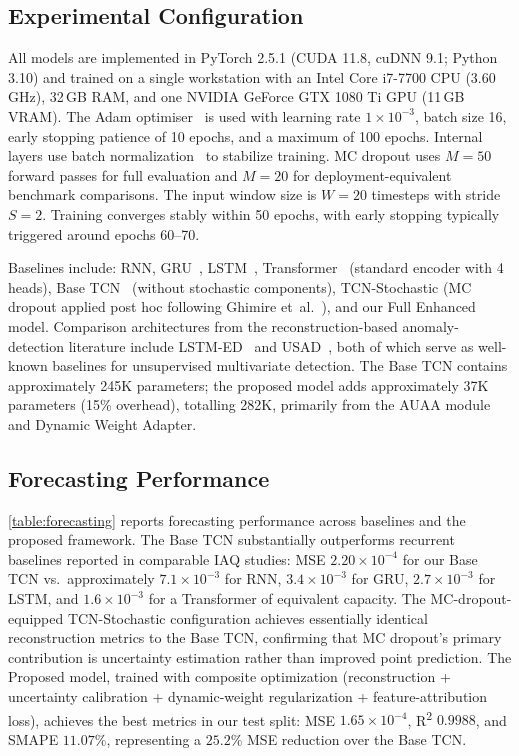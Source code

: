 \subsection{Experimental Configuration}

All models are implemented in PyTorch 2.5.1 (CUDA 11.8, cuDNN 9.1; Python 3.10) and trained on a single workstation with an Intel Core i7-7700 CPU (3.60\,GHz), 32\,GB RAM, and one NVIDIA GeForce GTX 1080 Ti GPU (11\,GB VRAM). The Adam optimiser~\cite{kingma2015adam} is used with learning rate $1 \times 10^{-3}$, batch size 16, early stopping patience of 10 epochs, and a maximum of 100 epochs. Internal layers use batch normalization~\cite{ioffe2015batchnorm} to stabilize training. MC dropout uses $M=50$ forward passes for full evaluation and $M=20$ for deployment-equivalent benchmark comparisons. The input window size is $W=20$ timesteps with stride $S=2$. Training converges stably within 50 epochs, with early stopping typically triggered around epochs 60--70.

Baselines include: RNN, GRU~\cite{cho2014gru}, LSTM~\cite{hochreiter1997lstm}, Transformer~\cite{vaswani2017attention} (standard encoder with 4 heads), Base TCN~\cite{bai2018tcn} (without stochastic components), TCN-Stochastic (MC dropout applied post hoc following Ghimire et~al.~\cite{ghimire_electricity_2025}), and our Full Enhanced model. Comparison architectures from the reconstruction-based anomaly-detection literature include LSTM-ED~\cite{malhotra2016lstmed} and USAD~\cite{audibert2020usad}, both of which serve as well-known baselines for unsupervised multivariate detection. The Base TCN contains approximately 245K parameters; the proposed model adds approximately 37K parameters (15\% overhead), totalling 282K, primarily from the AUAA module and Dynamic Weight Adapter.

\subsection{Forecasting Performance}

\cref{table:forecasting} reports forecasting performance across baselines and the proposed framework. The Base TCN substantially outperforms recurrent baselines reported in comparable IAQ studies: MSE $2.20\times 10^{-4}$ for our Base TCN vs.\ approximately $7.1\times 10^{-3}$ for RNN, $3.4\times 10^{-3}$ for GRU, $2.7\times 10^{-3}$ for LSTM, and $1.6\times 10^{-3}$ for a Transformer of equivalent capacity. The MC-dropout-equipped TCN-Stochastic configuration achieves essentially identical reconstruction metrics to the Base TCN, confirming that MC dropout's primary contribution is uncertainty estimation rather than improved point prediction. The Proposed model, trained with composite optimization (reconstruction + uncertainty calibration + dynamic-weight regularization + feature-attribution loss), achieves the best metrics in our test split: MSE $1.65\times 10^{-4}$, R\textsuperscript{2} $0.9988$, and SMAPE $11.07\%$, representing a $25.2\%$ MSE reduction over the Base TCN.

